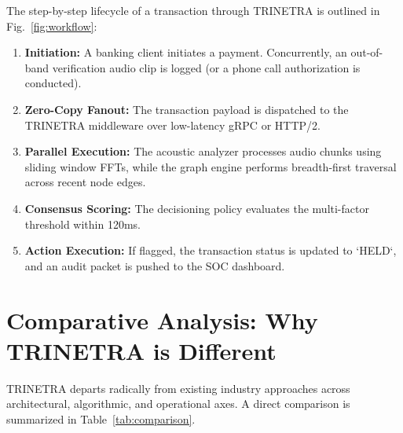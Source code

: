 \documentclass[10pt,journal,compsoc]{IEEEtran}
\begin{document}
The step-by-step lifecycle of a transaction through TRINETRA is outlined in Fig.~\ref{fig:workflow}:
\begin{enumerate}
    \item \textbf{Initiation:} A banking client initiates a payment. Concurrently, an out-of-band verification audio clip is logged (or a phone call authorization is conducted).
    \item \textbf{Zero-Copy Fanout:} The transaction payload is dispatched to the TRINETRA middleware over low-latency gRPC or HTTP/2.
    \item \textbf{Parallel Execution:} The acoustic analyzer processes audio chunks using sliding window FFTs, while the graph engine performs breadth-first traversal across recent node edges.
    \item \textbf{Consensus Scoring:} The decisioning policy evaluates the multi-factor threshold within 120ms.
    \item \textbf{Action Execution:} If flagged, the transaction status is updated to `HELD`, and an audit packet is pushed to the SOC dashboard.
\end{enumerate}

\section{Comparative Analysis: Why TRINETRA is Different}
\label{sec:comparison}

TRINETRA departs radically from existing industry approaches across architectural, algorithmic, and operational axes. A direct comparison is summarized in Table~\ref{tab:comparison}.
\end{document}
